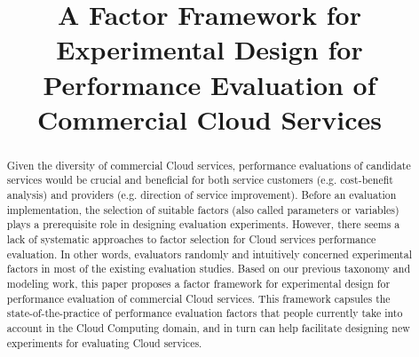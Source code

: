 \documentclass[10pt, conference, compsocconf]{IEEEtran}
\begin{document}
\title{A Factor Framework for Experimental Design for Performance Evaluation of Commercial Cloud Services}




\author{
\and
{}
\and
{}
\and
{}
}









\maketitle


\begin{abstract}
Given the diversity of commercial Cloud services, performance evaluations of candidate services would be crucial and beneficial for both service customers (e.g. cost-benefit analysis) and providers (e.g. direction of service improvement). Before an evaluation implementation, the selection of suitable factors (also called parameters or variables) plays a prerequisite role in designing evaluation experiments. However, there seems a lack of systematic approaches to factor selection for Cloud services performance evaluation. In other words, evaluators randomly and intuitively concerned experimental factors in most of the existing evaluation studies. Based on our previous taxonomy and modeling work, this paper proposes a factor framework for experimental design for performance evaluation of commercial Cloud services. This framework capsules the state-of-the-practice of performance evaluation factors that people currently take into account in the Cloud Computing domain, and in turn can help facilitate designing new experiments for evaluating Cloud services.

\end{abstract}
\end{document}
